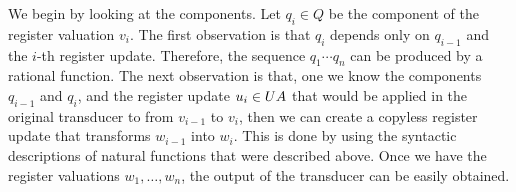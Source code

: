 We begin by looking at the components.  Let $q_i \in Q$ be the component of the register valuation $v_i$. The first observation is that $q_i$ depends only on $q_{i-1}$ and the $i$-th register update. Therefore, the sequence $q_1 \cdots q_n$ can be produced by a rational function. The next observation is that, one we know the components $q_{i-1}$ and $q_{i}$, and the register update $u_i \in \functoru A$ that would be applied in the original transducer to from $v_{i-1}$ to $v_i$, then we can create a copyless register update that transforms $w_{i-1}$ into $w_i$. This is done by using the syntactic descriptions of natural functions that were described above. Once we have the register valuations $w_1,\ldots,w_n$, the output of the transducer can be easily obtained.

